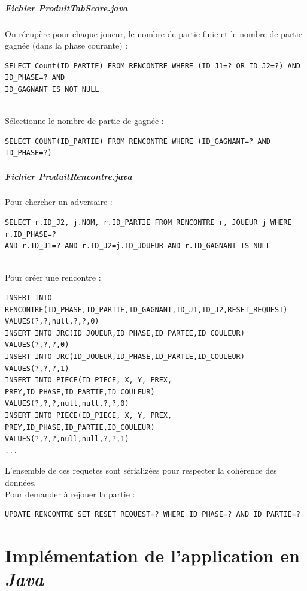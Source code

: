 \documentclass[10pt,a4paper]{report}
\begin{document}
\paragraph{Fichier ProduitTabScore.java}
On récupère pour chaque joueur, le nombre de partie finie et le nombre de partie gagnée (dans la phase courante) :
\begin{verbatim}
SELECT Count(ID_PARTIE) FROM RENCONTRE WHERE (ID_J1=? OR ID_J2=?) AND ID_PHASE=? AND 
ID_GAGNANT IS NOT NULL
\end{verbatim}
\\
Sélectionne le nombre de partie de gagnée :
\begin{verbatim}
SELECT COUNT(ID_PARTIE) FROM RENCONTRE WHERE (ID_GAGNANT=? AND ID_PHASE=?)
\end{verbatim}

\paragraph{Fichier ProduitRencontre.java}
Pour chercher un adversaire :
\begin{verbatim}
SELECT r.ID_J2, j.NOM, r.ID_PARTIE FROM RENCONTRE r, JOUEUR j WHERE r.ID_PHASE=? 
AND r.ID_J1=? AND r.ID_J2=j.ID_JOUEUR AND r.ID_GAGNANT IS NULL
\end{verbatim}
\\

Pour créer une rencontre : 
\begin{verbatim}
INSERT INTO RENCONTRE(ID_PHASE,ID_PARTIE,ID_GAGNANT,ID_J1,ID_J2,RESET_REQUEST) 
VALUES(?,?,null,?,?,0)
INSERT INTO JRC(ID_JOUEUR,ID_PHASE,ID_PARTIE,ID_COULEUR) VALUES(?,?,?,0)
INSERT INTO JRC(ID_JOUEUR,ID_PHASE,ID_PARTIE,ID_COULEUR) VALUES(?,?,?,1)
INSERT INTO PIECE(ID_PIECE, X, Y, PREX, PREY,ID_PHASE,ID_PARTIE,ID_COULEUR) 
VALUES(?,?,?,null,null,?,?,0)
INSERT INTO PIECE(ID_PIECE, X, Y, PREX, PREY,ID_PHASE,ID_PARTIE,ID_COULEUR) 
VALUES(?,?,?,null,null,?,?,1)
...
\end{verbatim}
L'ensemble de ces requetes sont sérializées pour respecter la cohérence des données.
\\

Pour demander à rejouer la partie :
\begin{verbatim}
UPDATE RENCONTRE SET RESET_REQUEST=? WHERE ID_PHASE=? AND ID_PARTIE=?
\end{verbatim}

\chapter{Implémentation de l’application en \textit{Java}}
\end{document}

